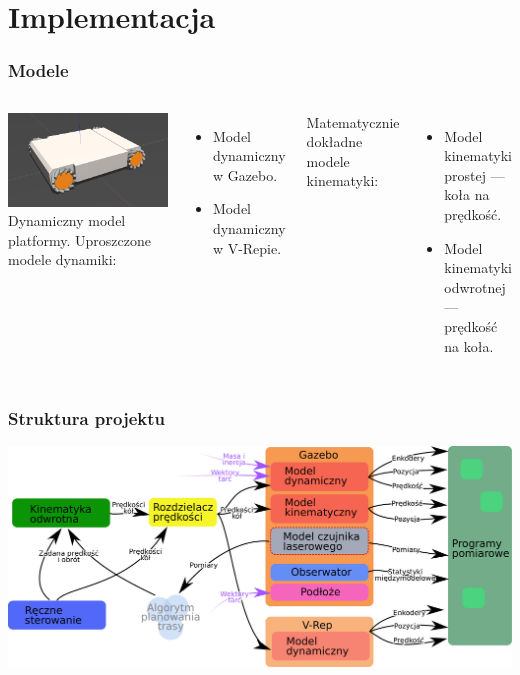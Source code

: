 \documentclass{beamer}
\begin{document}
	\section{Implementacja}
	\begin{frame}
		\frametitle{Modele}
		\begin{columns}[c]
			\centering
			\includegraphics[width=\textwidth]{graphics/model.png} \\
			Dynamiczny model platformy.
			Uproszczone modele dynamiki:
			\begin{itemize}
				\item Model dynamiczny w Gazebo.
				\item Model dynamiczny w V-Repie.
			\end{itemize}
			Matematycznie dokładne modele kinematyki:
			\begin{itemize}
				\item Model kinematyki prostej --- koła na prędkość.
				\item Model kinematyki odwrotnej --- prędkość na koła.
			\end{itemize}
		\end{columns}
	\end{frame}
	\begin{frame}
		\frametitle{Struktura projektu}
		\centering
		\includegraphics[width=\textwidth]{graphics/comm.pdf} 
	\end{frame}
\end{document}
